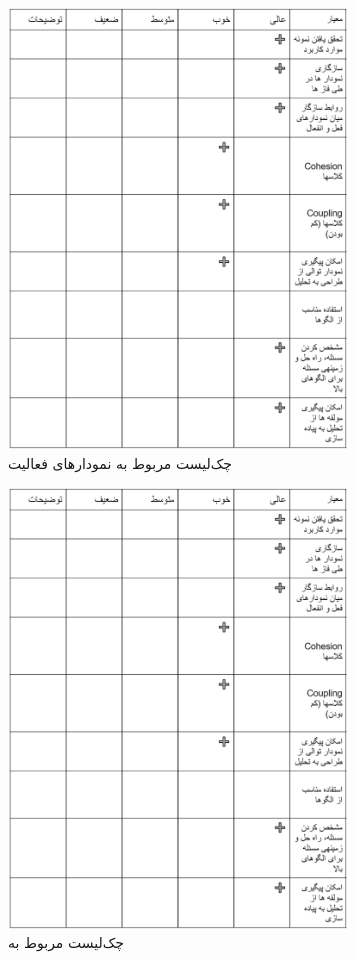 \begin{figure}[H]
    \centering
    \includegraphics[width = 0.8\textwidth]{files/figures/checklists/activityDiagrams.png}
    \caption{چک‌لیست مربوط به نمودارهای فعالیت}
    \label{fig:adcl}
\end{figure}

\begin{figure}[H]
    \centering
    \includegraphics[width = 0.8\textwidth]{files/figures/checklists/activityDiagrams.png}
    \caption{چک‌لیست مربوط به }
    \label{fig:eabcl}
\end{figure}